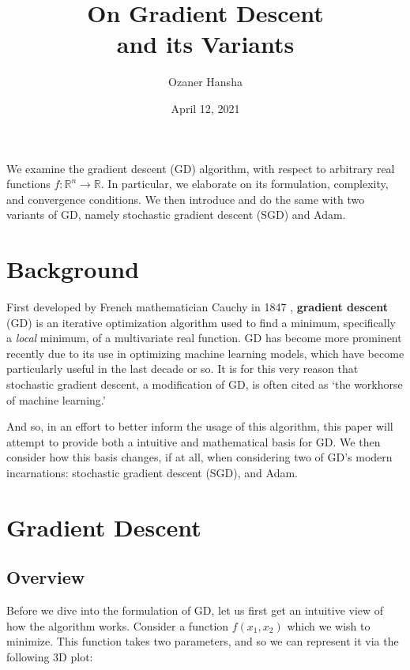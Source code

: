 \documentclass{article}
\makeatletter
\newcommand{\R}{\mathbb R}
\let\oldabstract\abstract
\let\oldendabstract\endabstract
\renewenvironment{abstract}
{\renewenvironment{quotation}%
  {\list{}{\addtolength{\leftmargin}{6em} %
      \listparindent 1.5em%
      \itemindent    \listparindent%
      \rightmargin   \leftmargin%
      \parsep        \z@ \@plus\p@}%
    \item\relax}%
  {\endlist}%
\oldabstract}
{\oldendabstract}
\makeatother
\begin{document}
\title{On Gradient Descent\\and its Variants}
\author{Ozaner Hansha}
\date{April 12, 2021}
\maketitle

\begin{abstract}
    We examine the gradient descent (GD) algorithm, with respect to arbitrary real functions $f:\R^n\to\R$. In particular, we elaborate on its formulation, complexity, and convergence conditions. We then introduce and do the same with two variants of GD, namely stochastic gradient descent (SGD) and Adam.
\end{abstract}

\section*{Background}
First developed by French mathematician Cauchy in 1847 \cite{cauchyAndGradient}, \textbf{gradient descent} (GD) is an iterative optimization algorithm used to find a minimum, specifically a \textit{local} minimum, of a multivariate real function. GD has become more prominent recently due to its use in optimizing machine learning models, which have become particularly useful in the last decade or so. It is for this very reason that stochastic gradient descent, a modification of GD, is often cited as `the workhorse of machine learning.'

And so, in an effort to better inform the usage of this algorithm, this paper will attempt to provide both a intuitive and mathematical basis for GD. We then consider how this basis changes, if at all, when considering two of GD's modern incarnations: stochastic gradient descent (SGD), and Adam.

\section*{Gradient Descent}
\subsection*{Overview}
  Before we dive into the formulation of GD, let us first get an intuitive view of how the algorithm works. Consider a function $f(x_1,x_2)$ which we wish to minimize. This function takes two parameters, and so we can represent it via the following 3D plot:
\end{document}
